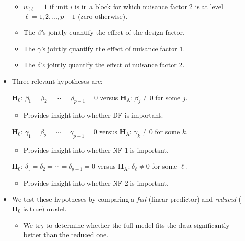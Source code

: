 \begin{itemize}
\begin{itemize}
              \item $ w_{i\ell}=1 $ if unit $ i $ is in a block for which nuisance factor 2 is at level $ \ell=1,2,\ldots,p-1 $ (zero otherwise).
              \item The $\beta$'s jointly quantify the effect of the design factor.
              \item The $\gamma$'s jointly quantify the effect of nuisance factor 1.
              \item The $\delta$'s jointly quantify the effect of nuisance factor 2.
          \end{itemize}
    \item Three relevant hypotheses are:
          \begin{tightcenter}
              $ \mathbf{H}_0 $: $ \beta_1=\beta_2=\cdots=\beta_{p-1}=0 $ versus $ \mathbf{H}_\text{A} $: $ \beta_j\ne 0$ for some $ j $.
              \begin{itemize}
                  \item Provides insight into whether DF is important.
              \end{itemize}
              $ \mathbf{H}_0 $: $ \gamma_1=\beta_2=\cdots=\gamma_{p-1}=0 $ versus $ \mathbf{H}_\text{A} $: $ \gamma_k\ne 0$ for some $ k $.
              \begin{itemize}
                  \item Provides insight into whether NF 1 is important.
              \end{itemize}
              $ \mathbf{H}_0 $: $ \delta_1=\delta_2=\cdots=\delta_{p-1}=0 $ versus $ \mathbf{H}_\text{A} $: $ \delta_\ell\ne 0$ for some $ \ell $.
              \begin{itemize}
                  \item Provides insight into whether NF 2 is important.
              \end{itemize}
          \end{tightcenter}
    \item We test these hypotheses by comparing a \emph{full} (linear predictor) and \emph{reduced} ($ \mathbf{H}_0 $ is true) model.
          \begin{itemize}
              \item We try to determine whether the full model fits the data significantly better than the reduced one.
          \end{itemize}
\end{itemize}
